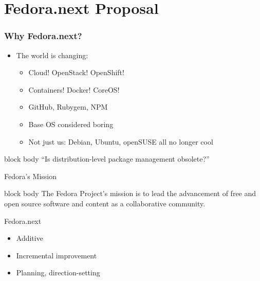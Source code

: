 \documentclass{beamer}
\begin{document}
\section{Fedora.next Proposal}
\begin{frame}
  \frametitle{Why Fedora.next?}
  \begin{itemize}
    \item The world is changing:
      \begin{itemize}
        \item Cloud! OpenStack! OpenShift!
        \item Containers! Docker! CoreOS!
        \item GitHub, Rubygem, NPM
        \item Base OS considered boring
        \item Not just us: Debian, Ubuntu, openSUSE all \alert{no
          longer cool}
      \end{itemize}
  \end{itemize}
  \begin{beamercolorbox}[center,ht=2ex,dp=0.5ex,rounded=true]{block body}
    {\centering ``Is distribution-level package management
    obsolete?''}
  \end{beamercolorbox}
\end{frame}

\begin{frame}{Fedora's Mission}
  \begin{beamercolorbox}[center,ht=4ex,dp=0.5ex,rounded=true]{block body}
    {\centering The Fedora Project's mission is to lead the advancement of free and
  open source software and content as a collaborative community.}
  \end{beamercolorbox}
\end{frame}

\begin{frame}{Fedora.next}
  \begin{itemize}
    \item Additive
    \item Incremental improvement
    \item Planning, direction-setting
  \end{itemize}
\end{frame}
\end{document}
